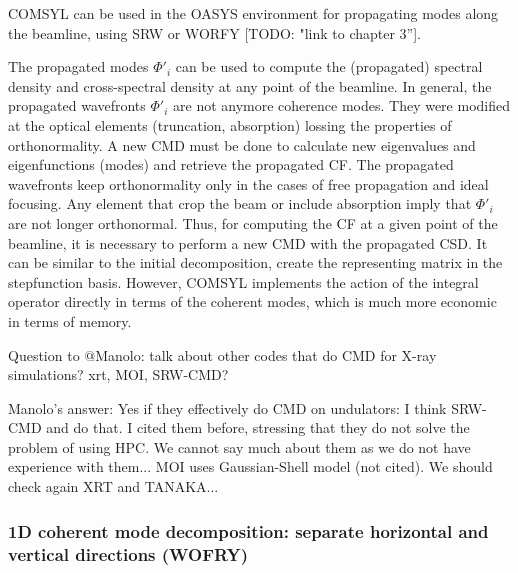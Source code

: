 \documentclass{iucr}              %
\newcommand{\todo}[1]{{\color{red}[TODO: "#1'']}}
\newcommand{\inred}[1]{{\color{red}#1}}
\begin{document}
COMSYL can be used in the OASYS environment for propagating modes along the beamline, using SRW or WORFY \todo{link to chapter 3}. 

The propagated modes $\Phi'_i$ can be used to compute the (propagated) spectral density and cross-spectral density at any point of the beamline. 
In general, the propagated wavefronts $\Phi'_i$ are not anymore coherence modes. They were modified at the optical elements (truncation, absorption) lossing the properties of orthonormality. A new CMD must be done to calculate new eigenvalues and eigenfunctions (modes) and retrieve the propagated CF. The propagated wavefronts keep orthonormality only in the cases of free propagation and ideal focusing. Any element that crop the beam or include absorption imply that $\Phi'_i$ are not longer orthonormal. 
Thus, for computing the CF at a given point of the beamline, it is necessary to perform a new CMD with the propagated CSD. It can be similar to the initial decomposition, create the representing matrix in the stepfunction basis. However, COMSYL implements
the action of the integral operator directly in terms of the coherent modes, which is much more economic in terms of
memory. 


\inred{Question to @Manolo: talk about other codes that do CMD for X-ray simulations? xrt, MOI, SRW-CMD?

Manolo's answer: Yes if they effectively do CMD on undulators: I think SRW-CMD and \cite{SVDHanXu} do that. I cited them before, stressing that they do not solve the problem of using HPC. We cannot say much about them as we do not have experience with them... MOI uses Gaussian-Shell model (not cited).  We should check again XRT and TANAKA...}

\subsubsection{1D coherent mode decomposition: separate horizontal and vertical directions (WOFRY)\\}
\end{document}
